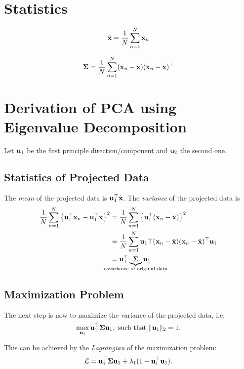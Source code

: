 \section{Statistics}
\begin{definition}
\[
\bar{\mathbf{x}} = \frac{1}{N} \sum_{n=1}^{N} \mathbf{x}_n
\]
\end{definition}

\begin{definition}
\[
\mathbf{\Sigma} = \frac{1}{N}\sum_{n=1}^{N}(\mathbf{x}_n - \bar{\mathbf{x}})(\mathbf{x}_n - \bar{\mathbf{x}})^\top
\]
\end{definition}

\section{Derivation of PCA using Eigenvalue Decomposition}
Let \(\mathbf{u}_1\) be the first principle direction/component and \(\mathbf{u}_2\) the second one.

\subsection{Statistics of Projected Data}
The \textit{mean} of the projected data is \(\mathbf{u}_1^\top \bar{\mathbf{x}}\). The \textit{variance} of the projected data is \begin{align*}
\frac{1}{N}\sum_{n=1}^N \left\lbrace \matr{u}_1^\top \matr{x}_n - \matr{u}_1^\top \bar{\matr{x}} \right\rbrace^2 &= \frac{1}{N} \sum_{n=1}^N \left\lbrace \matr{u}_1^\top (\matr{x}_n - \bar{\matr{x}}) \right\rbrace^2\\
&= \frac{1}{N} \sum_{n=1}^N \matr{u}_1\top (\matr{x}_n - \bar{\matr{x}}) (\matr{x}_n - \bar{\matr{x}})^\top \matr{u}_1\\
&= \matr{u}_1^\top \underbrace{\matr{\Sigma}}_{\mathclap{\text{covariance of original data}}} \matr{u}_1
\end{align*}

\subsection{Maximization Problem}
The next step is now to maximize the variance of the projected data, i.e.
\[
\max_{\mathbf{u}_1} \mathbf{u}_1^\top \mathbf{\Sigma} \mathbf{u}_1,\ \text{such that } \|\mathbf{u}_1\|_2 = 1.
\]

This can be achieved by the \textit{Lagrangian} of the maximization problem:
\[
\mathcal{L} = \mathbf{u}_1^\top \mathbf{\Sigma} \mathbf{u}_1 + \lambda_1 (1 - \mathbf{u}_1^\top \mathbf{u}_1).
\]

